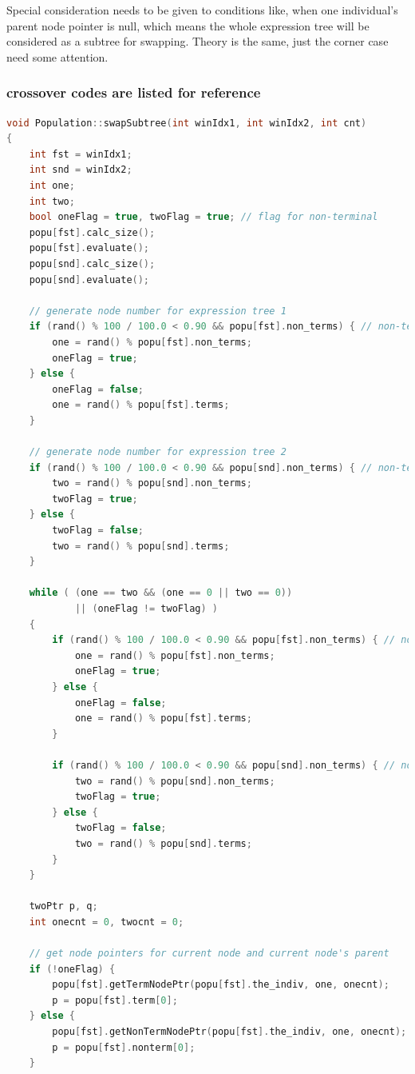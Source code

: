 \documentclass[10pt,b5paper]{article}
\begin{document}
Special consideration needs to be given to conditions like, when one individual's parent node pointer is null, which means the whole expression tree will be considered as a subtree for swapping. Theory is the same, just the corner case need some attention. 
\subsubsection{crossover codes are listed for reference}
\label{sec-1-3-2}
\begin{lstlisting}[language=c++]
void Population::swapSubtree(int winIdx1, int winIdx2, int cnt) 
{
    int fst = winIdx1;
    int snd = winIdx2;
    int one;
    int two;
    bool oneFlag = true, twoFlag = true; // flag for non-terminal
    popu[fst].calc_size();
    popu[fst].evaluate();
    popu[snd].calc_size();
    popu[snd].evaluate();

    // generate node number for expression tree 1
    if (rand() % 100 / 100.0 < 0.90 && popu[fst].non_terms) { // non-terminal swap
        one = rand() % popu[fst].non_terms;
        oneFlag = true;  
    } else {    
        oneFlag = false;
        one = rand() % popu[fst].terms;
    }

    // generate node number for expression tree 2
    if (rand() % 100 / 100.0 < 0.90 && popu[snd].non_terms) { // non-terminal swap
        two = rand() % popu[snd].non_terms;
        twoFlag = true;
    } else {    
        twoFlag = false;
        two = rand() % popu[snd].terms;
    }
    
    while ( (one == two && (one == 0 || two == 0))
            || (oneFlag != twoFlag) )
    {
        if (rand() % 100 / 100.0 < 0.90 && popu[fst].non_terms) { // non-terminal swap
            one = rand() % popu[fst].non_terms;
            oneFlag = true;
        } else {    
            oneFlag = false;
            one = rand() % popu[fst].terms;
        }
    
        if (rand() % 100 / 100.0 < 0.90 && popu[snd].non_terms) { // non-terminal swap
            two = rand() % popu[snd].non_terms;
            twoFlag = true;
        } else {    
            twoFlag = false;
            two = rand() % popu[snd].terms;
        }
    }

    twoPtr p, q;
    int onecnt = 0, twocnt = 0;

    // get node pointers for current node and current node's parent
    if (!oneFlag) {        
        popu[fst].getTermNodePtr(popu[fst].the_indiv, one, onecnt);
        p = popu[fst].term[0];
    } else {        
        popu[fst].getNonTermNodePtr(popu[fst].the_indiv, one, onecnt);
        p = popu[fst].nonterm[0];
    }


\end{lstlisting}
\end{document}
